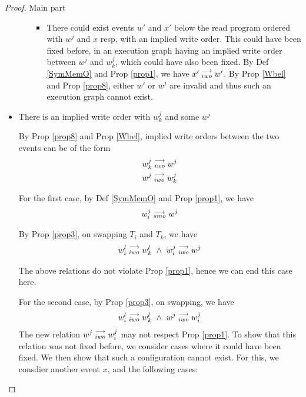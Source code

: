 \begin{proof}{Main part}
\begin{itemize}
\begin{enumerate}
\begin{itemize}
                                    \item There could exist events $w'$ and $x'$ below the read program ordered with $w^j$ and $x$ resp, with an implied write order. This could have been fixed before, in an execution graph having an implied write order between $w^j$ and $w_k^j$, which could have also been fixed.
                                    By Def \ref{SymMemO} and Prop \ref{prop1}, we have $x'\stackrel{\longrightarrow}{_{iwo}}w'$.
                                    By Prop \ref{Wbel} and Prop \ref{prop8}, either $w'$ or $w^j$ are invalid and thus such an execution graph cannot exist. 
                                    
                                \end{itemize}

                        \end{enumerate}
                        
                    \item There is an implied write order with $w_k^j$ and some $w^j$
                    
                        By Prop \ref{prop8} and Prop \ref{Wbel}, implied write orders between the two events can be of the form 
                        \begin{align*}
                            w_k^j\stackrel{\longrightarrow}{_{iwo}}w^j \\
                            w^j\stackrel{\longrightarrow}{_{iwo}}w_k^j 
                        \end{align*}

                        For the first case, by Def \ref{SymMemO} and Prop \ref{prop1}, we have
                        \begin{align*}
                            w_i^j\stackrel{\longrightarrow}{_{smo}}w^j
                        \end{align*}

                        By Prop \ref{prop3}, on swapping $T_i$ and $T_k$, we have 
                        \begin{align*}
                            \reln{w_i^l}{iwo}{w_k^l} \ \wedge \ \reln{w_i^j}{iwo}{w^j}
                        \end{align*}

                        The above relations do not violate Prop \ref{prop1}, hence we can end this case here. 

                        For the second case, by Prop \ref{prop3}, on swapping, we have 
                        \begin{align*}
                            \reln{w_i^l}{iwo}{w_k^l} \ \wedge \ \reln{w^j}{iwo}{w_i^j}
                        \end{align*}
                        The new relation $w^j\stackrel{\longrightarrow}{_{iwo}}w_i^j$ may not respect Prop \ref{prop1}. 
                        To show that this relation was not fixed before, we consider cases where it could have been fixed. We then show that such a configuration cannot exist. For this, we consdier another event $x$, and the following cases:


\end{itemize}
\end{proof}
